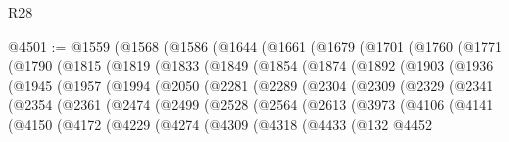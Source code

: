 \begin{lexlean}{R28}
\begin{coremodule}
@4501 := @1559
    (@1568
      (@1586
        (@1644
          (@1661
            (@1679
              (@1701
                (@1760
                  (@1771
                    (@1790
                      (@1815
                        (@1819
                          (@1833
                            (@1849
                              (@1854
                                (@1874
                                  (@1892
                                    (@1903
                                      (@1936
                                        (@1945
                                          (@1957
                                            (@1994
                                              (@2050
                                                (@2281
                                                  (@2289
                                                    (@2304
                                                      (@2309
                                                        (@2329
                                                          (@2341
                                                            (@2354
                                                              (@2361
                                                                (@2474
                                                                  (@2499
                                                                    (@2528
                                                                      (@2564
                                                                        (@2613
                                                                          (@3973
                                                                            (@4106
                                                                              (@4141
                                                                                (@4150
                                                                                  (@4172
                                                                                    (@4229
                                                                                      (@4274
                                                                                        (@4309
                                                                                          (@4318
                                                                                            (@4433
                                                                                              (@132
                                                                                                @4452

\end{coremodule}
\end{lexlean}
